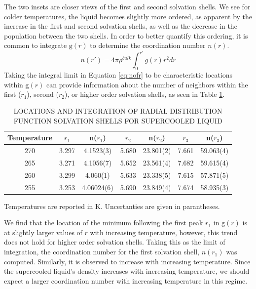 The two insets are closer views of the first and second solvation
shells. We see for colder temperatures, the liquid becomes slightly
more ordered, as apparent by the increase in the first and second
solvation shells, as well as the decrease in the population between
the two shells. In order to better quantify this ordering, it is
common to integrate $\mathrm{g}(r)$ to determine the
coordination number $n(r)$.
\begin{equation}\label{eq:nofr}
n(r') = 4 \pi \rho^{bulk} \int_0^{r'} g(r)r^2dr
\end{equation}
Taking the integral limit in Equation \eqref{eq:nofr} to be
characteristic locations within $\mathrm{g}(r)$ can provide
information about the number of neighbors within the first ($r_1$),
second ($r_2$), or higher order solvation shells, as seen in Table
\ref{tab:gofr}.

\begin{table}[h] \centering \caption{LOCATIONS AND INTEGRATION OF
    RADIAL DISTRIBUTION FUNCTION SOLVATION SHELLS FOR SUPERCOOLED LIQUID\label{tab:gofr}}
\begin{tabular}{ccccccc}
  \hline
  \hline
  Temperature & $r_1$ & n($r_1$) & $r_2$ & n($r_2$) & $r_3$ &
                                                                       n($r_3$) \\
  \hline
  270 & 3.297 &4.1523(3) & 5.680 & 23.801(2) & 7.661 & 59.063(4) \\
  265 & 3.271 & 4.1056(7) & 5.652 & 23.561(4) & 7.682 & 59.615(4) \\
  260 & 3.299 & 4.060(1) & 5.633 & 23.338(5) & 7.615 & 57.871(5) \\
  255 & 3.253 & 4.06024(6) & 5.690 & 23.849(4) & 7.674 & 58.935(3)  \\
  \hline
  \hline
\end{tabular}
\begin{flushleft}
Temperatures are reported in K. Uncertanties are given in parantheses.
\end{flushleft}
\end{table}

We find that the location of the minimum following the first peak
$r_1$ in $\mathrm{g}(r)$ is at slightly larger values of $r$ with
increasing temperature, however, this trend does not hold for higher
order solvation shells. Taking this as the limit of integration, the
coordination number for the first solvation shell, $n(r_1)$ was
computed. Similarly, it is observed to increase with increasing
temperature. Since the supercooled liquid's density increases with
increasing temperature, we should expect a larger coordination number
with increasing temperature in this regime.

